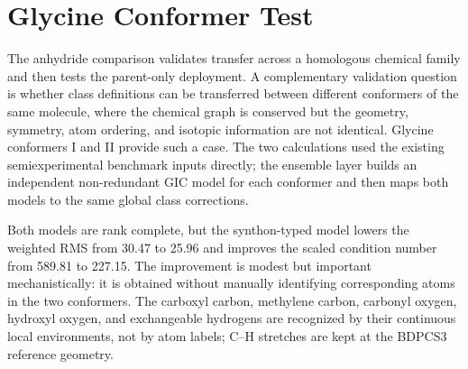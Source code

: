 \documentclass[journal=jpclcd,manuscript=letter]{achemso}
\begin{document}
\section*{Glycine Conformer Test}

The anhydride comparison validates transfer across a homologous chemical family and then tests the parent-only deployment.  A complementary validation question is whether class definitions can be transferred between different conformers of the same molecule, where the chemical graph is conserved but the geometry, symmetry, atom ordering, and isotopic information are not identical.  Glycine conformers I and II provide such a case.  The two calculations used the existing semiexperimental benchmark inputs directly; the ensemble layer builds an independent non-redundant GIC model for each conformer and then maps both models to the same global class corrections.

\begin{table}[H]
\centering
\caption{Glycine I/II ensemble refinement using two class definitions.  The element/value model uses ordinary atom symbols and C--O value windows.  The synthon model replaces those coarse atom types by continuous $Z_\mathrm{eff}$ prototypes with a threshold of 0.035.  C--H stretches are retained at the BDPCS3 reference values in both variants.}
\label{tab:glycine_typing}

\end{table}

Both models are rank complete, but the synthon-typed model lowers the weighted RMS from 30.47 to 25.96 and improves the scaled condition number from 589.81 to 227.15.  The improvement is modest but important mechanistically: it is obtained without manually identifying corresponding atoms in the two conformers.  The carboxyl carbon, methylene carbon, carbonyl oxygen, hydroxyl oxygen, and exchangeable hydrogens are recognized by their continuous local environments, not by atom labels; C--H stretches are kept at the BDPCS3 reference geometry.

\begin{table}[H]
\centering
\caption{Threshold scan for the continuous glycine synthon atom types.  The model is accepted and unchanged from 0.010 to 0.075, showing that the selected threshold is inside a stable plateau.  At 0.100, chemically distinct atom types begin to overlap, the numerical rank drops, and the acceptance policy rejects the singular model.}
\label{tab:glycine_synthon_threshold}

\end{table}
\end{document}
